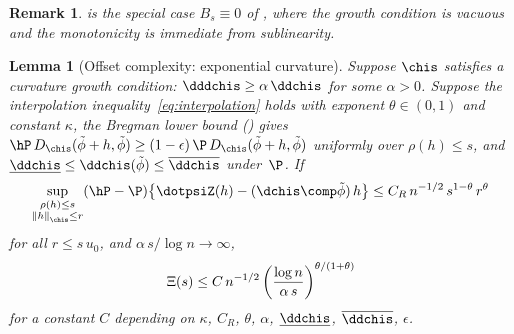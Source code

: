 \documentclass{article}
\newtheorem{lemma}[theorem]{Lemma}
\newtheorem{remark}{Remark}[section]
\begin{document}
\begin{remark}
 is the special case $B_s \equiv 0$
of ,
where the growth condition is vacuous
and the monotonicity is immediate from sublinearity.
\end{remark}

\begin{lemma}[Offset complexity: exponential curvature]
\label{lem:xi-jensen}
Suppose $\chis$ satisfies
a curvature growth condition:
$\dddchis \ge \alpha\, \ddchis$
for some $\alpha > 0$.
Suppose the interpolation inequality~\eqref{eq:interpolation}
holds with exponent $\theta \in (0,1)$ and constant $\kappa$,
the Bregman lower bound
()
gives
$\hP\, D_{\chis}(\tilde\phi + h, \tilde\phi)
  \ge (1-\epsilon)\, \P\, D_{\chis}(\tilde\phi + h, \tilde\phi)$
uniformly over $\rho(h) \le s$,
and $\underline{\ddchis} \le \ddchis(\tilde\phi) \le \overline{\ddchis}$
under~$\P$.
If
\[
\sup_{\substack{\rho(h) \le s \\
    \norm{h}_{\chis} \le r}}
  (\hP - \P)\qty{\dotpsiZ(h) - (\dchis \comp \tilde\phi)\,h}
  \le C_R\, n^{-1/2}\, s^{1-\theta}\, r^\theta
\]
for all $r \le s\, u_0$,
and $\alpha\, s / \log n \to \infty$,
\begin{equation}
\label{eq:xi-jensen-bound}
\Xi(s) \le C\, n^{-1/2}\,
    \qty(\frac{\log n}{\alpha\, s})^{\theta/(1+\theta)}
\end{equation}
for a constant $C$ depending on
$\kappa$, $C_R$, $\theta$, $\alpha$,
$\underline{\ddchis}$, $\overline{\ddchis}$,
$\epsilon$.
\end{lemma}
\end{document}
